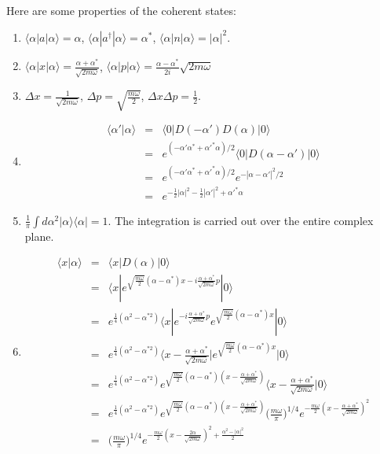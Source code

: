 \documentclass[12pt]{book}
\begin{document}
	Here are some properties of the coherent states:
	\begin{enumerate}
		\item $\langle \alpha |a|\alpha\rangle=\alpha$, $\langle \alpha |a^\dagger|\alpha\rangle=\alpha^*$, $\langle \alpha |n|\alpha\rangle=|\alpha|^2$.
		\item $\langle \alpha |x|\alpha\rangle=\frac{\alpha+\alpha^*}{\sqrt{2m\omega}}$, $\langle \alpha |p|\alpha\rangle=\frac{\alpha-\alpha^*}{2i}\sqrt{2m\omega}$
		\item $\Delta x=\frac 1{\sqrt{2m\omega}}$, $\Delta p=\sqrt{\frac {m\omega}2}$, $\Delta x\Delta p=\frac 12$.
		\item \begin{eqnarray}
			\langle \alpha' |\alpha\rangle&=&\langle 0|D(-\alpha')D(\alpha)|0\rangle\\
			&=&e^{(-\alpha'\alpha^*+\alpha'^*\alpha)/2}\langle 0|D(\alpha-\alpha')|0\rangle\\
			&=&e^{(-\alpha'\alpha^*+\alpha'^*\alpha)/2}e^{-|\alpha-\alpha'|^2/2}\\
			&=&e^{-\frac 12 |\alpha|^2-\frac 12 |\alpha'|^2+\alpha'^*\alpha}
		\end{eqnarray}
		\item $\frac 1\pi\int d\alpha^2 |\alpha\rangle\langle\alpha|=1$. The integration is carried out over the entire complex plane.
		\item \begin{eqnarray}
			\langle x|\alpha\rangle&=&\langle x|D(\alpha)|0\rangle\\
			&=&\langle x|e^{\sqrt{\frac{m\omega}2}(\alpha-\alpha^*)x-i\frac{\alpha+\alpha^*}{\sqrt{2m\omega}}p}|0\rangle\\
			&=&e^{\frac 14 (\alpha^2-\alpha^{*2})}\langle x|e^{-i\frac{\alpha+\alpha^*}{\sqrt{2m\omega}}p}e^{\sqrt{\frac{m\omega}2}(\alpha-\alpha^*)x}|0\rangle\\
			&=&e^{\frac 14 (\alpha^2-\alpha^{*2})}\Big\langle x-\frac{\alpha+\alpha^*}{\sqrt{2m\omega}}\Big|e^{\sqrt{\frac{m\omega}2}(\alpha-\alpha^*)x}\Big|0\Big                      \rangle\\
			&=&e^{\frac 14 (\alpha^2-\alpha^{*2})}e^{\sqrt{\frac{m\omega}2}(\alpha-\alpha^*)(x-\frac{\alpha+\alpha^*}{\sqrt{2m\omega}})}\Big\langle x-\frac{\alpha+\alpha^*}{\sqrt{2m\omega}}\Big|0\Big\rangle\\
			&=&e^{\frac 14 (\alpha^2-\alpha^{*2})}e^{\sqrt{\frac{m\omega}2}(\alpha-\alpha^*)(x-\frac{\alpha+\alpha^*}{\sqrt{2m\omega}})}\Big(\frac{m\omega}\pi\Big)^{1/4}e^{-\frac{m\omega}{2}(x-\frac{\alpha+\alpha^*}{\sqrt{2m\omega}})^2}\\
			&=&\Big(\frac{m\omega}\pi\Big)^{1/4}e^{-\frac{m\omega}{2}(x-\frac{2\alpha}{\sqrt{2m\omega}})^2+\frac{\alpha^2-|\alpha|^2}2}
		\end{eqnarray}
	\end{enumerate}
	
\end{document}
